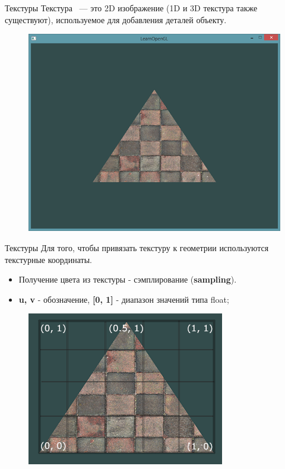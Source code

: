 \documentclass[aspectration=1610,t]{beamer}
\begin{document}
\begin{frame}[fragile]{Текстуры}
    Текстура ~--- это 2D изображение (1D и 3D текстура также существуют), используемое для добавления деталей объекту.

    \begin{figure}[htp]
        \centering
        \includegraphics[scale=0.40]{res/tex}
    \end{figure}
\end{frame}

\begin{frame}[fragile]{Текстуры}
    Для того, чтобы привязать текстуру к геометрии используются текстурные координаты.
    \begin{itemize}
        \item Получение цвета из текстуры - сэмплирование ({\bf sampling}).
        \item {\bf u, v} - обозначение, {\bf [0, 1]} - диапазон значений типа float;
    \end{itemize}

    \begin{figure}[htp]
        \centering
        \includegraphics[scale=0.40]{res/tex_coor}
    \end{figure}
\end{frame}
\end{document}
